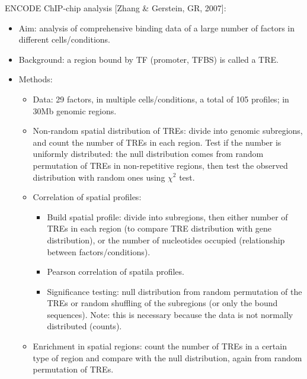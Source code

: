 \documentclass{report}
\begin{document}
\begin{enumerate}
	ENCODE ChIP-chip analysis [Zhang \& Gerstein, GR, 2007]:
	\begin{itemize}
		\item Aim: analysis of comprehensive binding data of a large number of factors in different cells/conditions. 
		
		\item Background: a region bound by TF (promoter, TFBS) is called a TRE. 
		
		\item Methods: 
		\begin{itemize}
			\item Data: 29 factors, in multiple cells/conditions, a total of 105 profiles; in 30Mb genomic regions. 
			
			\item Non-random spatial distribution of TREs: divide into genomic subregions, and count the number of TREs in each region. Test if the number is uniformly distributed: the null distribution comes from random permutation of TREs in non-repetitive regions, then test the observed distribution with random ones using $\chi^2$ test. 
			
			\item Correlation of spatial profiles: 
			\begin{itemize}
				\item Build spatial profile: divide into subregions, then either number of TREs in each region (to compare TRE distribution with gene distribution), or the number of nucleotides occupied (relationship between factors/conditions). 
				\item Pearson correlation of spatila profiles. 
				\item Significance testing: null distribution from random permutation of the TREs or random shuffling of the subregions (or only the bound sequences). Note: this is necessary because the data is not normally distributed (counts). 
			\end{itemize}
			
			\item Enrichment in spatial regions: count the number of TREs in a certain type of region and compare with the null distribution, again from random permutation of TREs. 
			

\end{itemize}
\end{itemize}
\end{enumerate}
\end{document}
